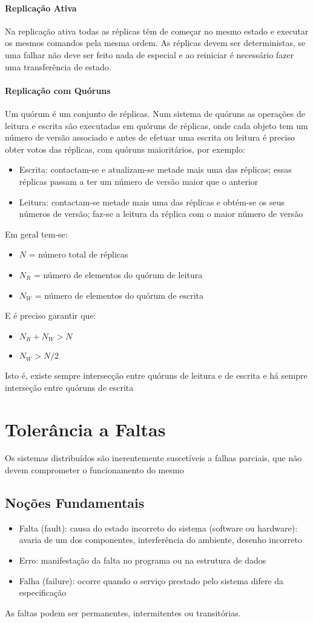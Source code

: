 \documentclass[10pt,a4paper]{report}
\begin{document}
\subsubsection{Replicação Ativa}
Na replicação ativa todas as réplicas têm de começar no mesmo estado e executar os mesmos comandos pela mesma ordem. As réplicas devem ser deterministas, se uma falhar não deve ser feito nada de especial e ao reiniciar é necessário fazer uma transferência de estado.
\subsubsection{Replicação com Quóruns}
Um quórum é um conjunto de réplicas. Num sistema de quóruns as operações de leitura e escrita são executadas em quóruns de réplicas, onde cada objeto tem um número de versão associado e antes de efetuar uma escrita ou leitura é preciso obter votos das réplicas, com quóruns maioritários, por exemplo:
\begin{itemize}
\item Escrita: contactam-se e atualizam-se metade mais uma das réplicas; essas réplicas passam a ter um número de versão maior que o anterior
\item Leitura: contactam-se metade mais uma das réplicas e obtém-se os seus números de versão; faz-se a leitura da réplica com o maior número de versão
\end{itemize}
Em geral tem-se:
\begin{itemize}
\item $N$ = número total de réplicas
\item $N_R$ = número de elementos do quórum de leitura
\item $N_W$ = número de elementos do quórum de escrita
\end{itemize}
E é preciso garantir que:
\begin{itemize}
\item $N_R + N_W > N$
\item $N_W > N/2$
\end{itemize}
Isto é, existe sempre intersecção entre quóruns de leitura e de escrita e há sempre interseção entre quóruns de escrita

\chapter{Tolerância a Faltas}
Os sistemas distribuídos são inerentemente suscetíveis a falhas parciais, que não devem comprometer o funcionamento do mesmo
\section{Noções Fundamentais}
\begin{itemize}
\item Falta (fault): causa do estado incorreto do sistema (software ou hardware): avaria de um dos componentes, interferência do ambiente, desenho incorreto
\item Erro: manifestação da falta no programa ou na estrutura de dados
\item Falha (failure): ocorre quando o serviço prestado pelo sistema difere da especificação
\end{itemize}
As faltas podem ser permanentes, intermitentes ou transitórias.
\end{document}
